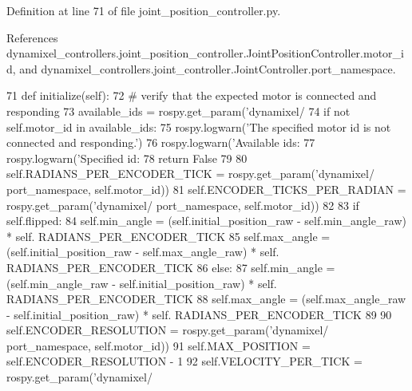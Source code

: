 Definition at line 71 of file joint\+\_\+position\+\_\+controller.\+py.



References dynamixel\+\_\+controllers.\+joint\+\_\+position\+\_\+controller.\+Joint\+Position\+Controller.\+motor\+\_\+id, and dynamixel\+\_\+controllers.\+joint\+\_\+controller.\+Joint\+Controller.\+port\+\_\+namespace.


\begin{DoxyCode}
71     \textcolor{keyword}{def }initialize(self):
72         \textcolor{comment}{# verify that the expected motor is connected and responding}
73         available\_ids = rospy.get\_param(\textcolor{stringliteral}{'dynamixel/%
74         \textcolor{keywordflow}{if} \textcolor{keywordflow}{not} self.motor\_id \textcolor{keywordflow}{in} available\_ids:
75             rospy.logwarn(\textcolor{stringliteral}{'The specified motor id is not connected and responding.'})
76             rospy.logwarn(\textcolor{stringliteral}{'Available ids: %
77             rospy.logwarn(\textcolor{stringliteral}{'Specified id: %
78             \textcolor{keywordflow}{return} \textcolor{keyword}{False}
79             
80         self.RADIANS\_PER\_ENCODER\_TICK = rospy.get\_param(\textcolor{stringliteral}{'dynamixel/%
      port\_namespace, self.motor\_id))
81         self.ENCODER\_TICKS\_PER\_RADIAN = rospy.get\_param(\textcolor{stringliteral}{'dynamixel/%
      port\_namespace, self.motor\_id))
82         
83         \textcolor{keywordflow}{if} self.flipped:
84             self.min\_angle = (self.initial\_position\_raw - self.min\_angle\_raw) * self.
      RADIANS\_PER\_ENCODER\_TICK
85             self.max\_angle = (self.initial\_position\_raw - self.max\_angle\_raw) * self.
      RADIANS\_PER\_ENCODER\_TICK
86         \textcolor{keywordflow}{else}:
87             self.min\_angle = (self.min\_angle\_raw - self.initial\_position\_raw) * self.
      RADIANS\_PER\_ENCODER\_TICK
88             self.max\_angle = (self.max\_angle\_raw - self.initial\_position\_raw) * self.
      RADIANS\_PER\_ENCODER\_TICK
89             
90         self.ENCODER\_RESOLUTION = rospy.get\_param(\textcolor{stringliteral}{'dynamixel/%
      port\_namespace, self.motor\_id))
91         self.MAX\_POSITION = self.ENCODER\_RESOLUTION - 1
92         self.VELOCITY\_PER\_TICK = rospy.get\_param(\textcolor{stringliteral}{'dynamixel/%
}}}}}}}
\end{DoxyCode}
